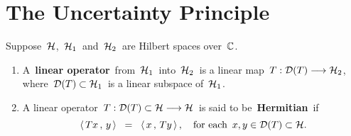 

\section{The Uncertainty Principle}
\setcounter{theorem}{0}
\setcounter{equation}{0}


\renewcommand{\theenumi}{\roman{enumi}}
\renewcommand{\labelenumi}{\textnormal{(\theenumi)}$\;\;$}


\begin{definition}
\mbox{}
\vskip 0.1cm
\noindent
Suppose \,$\mathcal{H}$,\, $\mathcal{H}_{1}$\, and \,$\mathcal{H}_{2}$\, are Hilbert spaces over \,$\mathbb{C}$.
\begin{enumerate}
\item
	A \,\textbf{linear operator}\, from \,$\mathcal{H}_{1}$\, into \,$\mathcal{H}_{2}$\,
	is a linear map
	\,$T : \mathcal{D}(T) \longrightarrow \mathcal{H}_{2}$,\,
	where \,$\mathcal{D}(T) \subset \mathcal{H}_{1}$\, is a linear subspace of \,$\mathcal{H}_{1}$.
\item
	A linear operator
	\,$T : \mathcal{D}(T) \subset \mathcal{H} \longrightarrow \mathcal{H}$\,
	is said to be \,\textbf{Hermitian}\, if
	\begin{equation*}
	\langle\,Tx\,,\,y\,\rangle
	\;\; = \;\;
		\langle\,x\,,\,Ty\,\rangle\,,
	\quad
	\textnormal{for each \,$x, y \in \mathcal{D}(T) \subset \mathcal{H}$}.
	\end{equation*}
\end{enumerate}
\end{definition}


